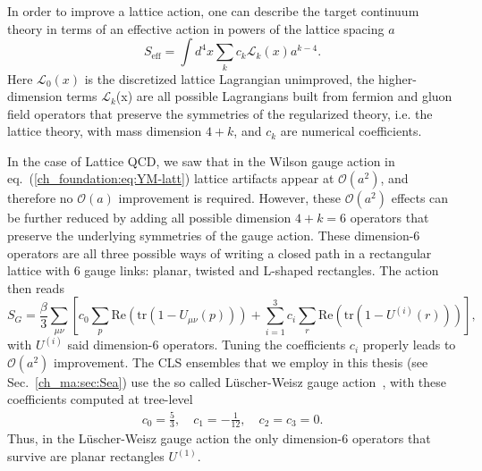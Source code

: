 In order to improve a lattice action, one can describe the target continuum theory in terms of an effective action in powers of the lattice spacing $a$
\begin{equation}
S_{\textrm{eff}}=\int d^4x\sum_kc_k\mathcal{L}_k(x)a^{k-4}.
\end{equation}
Here $\mathcal{L}_0(x)$ is the discretized lattice Lagrangian unimproved, the higher-dimension terms $\mathcal{L}_k$(x) are all possible Lagrangians built from fermion and gluon field operators that preserve the symmetries of the regularized theory, i.e. the lattice theory, with mass dimension $4+k$, and $c_k$ are numerical coefficients.

In the case of Lattice QCD, we saw that in the Wilson gauge action in eq.~(\ref{ch_foundation:eq:YM-latt}) lattice artifacts appear at $\mathcal{O}(a^2)$, and therefore no $\mathcal{O}(a)$ improvement is required. However, these $\mathcal{O}(a^2)$ effects can be further reduced by adding all possible dimension $4+k=6$ operators that preserve the underlying symmetries of the gauge action. These dimension-6 operators are all three possible ways of writing a closed path in a rectangular lattice with 6 gauge links: planar, twisted and L-shaped rectangles. The action then reads
\begin{equation}
\label{ch_foundation:eq:SG_impr}
S_G=\frac{\beta}{3}\sum_{\mu\nu}\left[c_0\sum_p{\textrm{Re}}\left({\textrm{tr}}\left(1-U_{\mu\nu}(p)\right)\right)+\sum_{i=1}^3c_i\sum_r{\textrm{Re}}\left({\textrm{tr}}\left(1-U^{(i)}(r)\right)\right)\right],
\end{equation}
with $U^{(i)}$ said dimension-6 operators. Tuning the coefficients $c_i$ properly leads to $\mathcal{O}(a^2)$ improvement. The CLS ensembles that we employ in this thesis (see Sec.~\ref{ch_ma:sec:Sea}) use the so called Lüscher-Weisz gauge action~\citep{Luscher:1984xn,Luscher:1985zq}, with these coefficients computed at tree-level
\begin{gather}
\label{ch_foundation:eq:LW}
c_0=\frac{5}{3}, \quad
c_1=-\frac{1}{12}, \quad
c_2=c_3=0.
\end{gather}
Thus, in the Lüscher-Weisz gauge action the only dimension-6 operators that survive are planar rectangles $U^{(1)}$.

